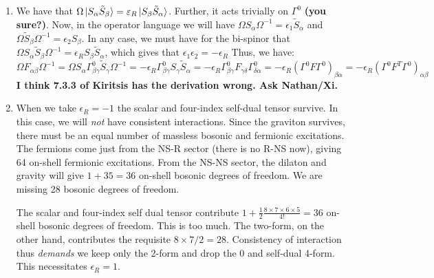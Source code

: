\documentclass[11pt, class=article, crop=false]{standalone}
\begin{document}
\begin{enumerate}
	\item We have that $\Omega \ket{S_\alpha \tilde S_\beta} = \varepsilon_R \ket{S_\beta \tilde S_\alpha}$. Further, it acts trivially on $\Gamma^0$ \textbf{(you sure?)}. Now, in the operator language we will have $\Omega S_\alpha \Omega^{-1} = \epsilon_1 \tilde S_\alpha$ and $\Omega \tilde S_\beta \Omega^{-1} = \epsilon_2 S_\beta$. In any case, we must have for the bi-spinor that $\Omega S_\alpha \tilde S_\beta \Omega^{-1} = \epsilon_R S_\beta \tilde S_\alpha$, which gives that $\epsilon_1 \epsilon_2 = -\epsilon_R$ Thus, we have:
	\[
		\Omega F_{\alpha \beta} \Omega^{-1} = \Omega S_\alpha \Gamma^0_{\beta \gamma} \tilde S_\gamma \Omega^{-1} = - \epsilon_R \Gamma^0_{\beta \gamma} S_{\gamma} \tilde S_\alpha = - \epsilon_R \Gamma^0_{\beta \gamma} F_{\gamma \delta} \Gamma^0_{\delta \alpha} = -\epsilon_R (\Gamma^0 F \Gamma^0)_{\beta \alpha} =  -\epsilon_R (\Gamma^0 F^T \Gamma^0)_{\alpha \beta }
	\]
	\textbf{I think 7.3.3 of Kiritsis has the derivation wrong. Ask Nathan/Xi.}
	\item When we take $\epsilon_R = -1$ the scalar and four-index self-dual tensor survive. In this case, we will \emph{not} have consistent interactions. Since the graviton survives, there must be an equal number of massless bosonic and fermionic excitations. The fermions come just from the NS-R sector (there is no R-NS now), giving 64 on-shell fermionic excitations. From the NS-NS sector, the dilaton and gravity will give $1+35 = 36$ on-shell bosonic degrees of freedom. We are missing 28 bosonic degrees of freedom. 
	
	The scalar and four-index self dual tensor contribute $1 + \frac12 \frac{8 \times 7 \times 6 \times 5}{4!} = 36$ on-shell bosonic degrees of freedom. This is too much. The two-form, on the other hand, contributes the requisite $8 \times 7 / 2= 28$. Consistency of interaction thus \emph{demands} we keep only the 2-form and drop the 0 and self-dual 4-form. This necessitates $\epsilon_R = 1$.
	

\end{enumerate}
\end{document}
